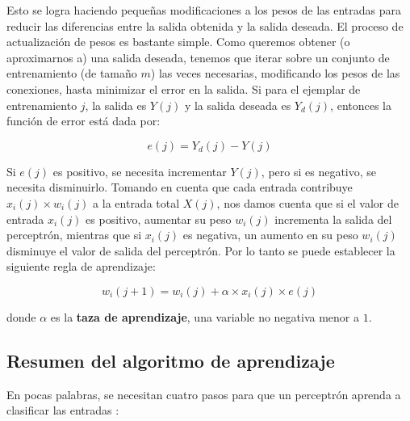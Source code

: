 Esto se logra haciendo pequeñas modificaciones a los pesos de las entradas para reducir las diferencias entre la salida obtenida y la salida deseada. El proceso de actualización de pesos es bastante simple. Como queremos obtener (o aproximarnos a) una salida deseada, tenemos que iterar sobre un conjunto de entrenamiento (de tamaño $m$) las veces necesarias, modificando los pesos de las conexiones, hasta minimizar el error en la salida. Si para el ejemplar de entrenamiento $j$, la salida es $Y(j)$ y la salida deseada es $Y_d(j)$, entonces la función de error está dada por:

\[ e(j) = Y_d(j)-Y(j)\]
\parencite[171]{Nengnevitsky2005}

Si $e(j)$ es positivo, se necesita incrementar $Y(j)$, pero si es negativo, se necesita disminuirlo. Tomando en cuenta que cada entrada contribuye \(x_i(j) \times w_i(j)\) a la entrada total $X(j)$, nos damos cuenta que si el valor de entrada $x_i(j)$ es positivo, aumentar su peso $w_i(j)$ incrementa la salida del perceptrón, mientras que si $x_i(j)$ es negativa, un aumento en su peso $w_i(j)$ disminuye el valor de salida del perceptrón. Por lo tanto se puede establecer la siguiente regla de aprendizaje:

\[w_i(j+1) = w_i(j) + \alpha \times x_i(j) \times e(j) \]
\parencite[171]{Nengnevitsky2005}

\noindent donde $\alpha$ es la \textbf{taza de aprendizaje}, una variable no negativa menor a $1$.

\subsection{Resumen del algoritmo de aprendizaje}

\noindent En pocas palabras, se necesitan cuatro pasos para que un perceptrón aprenda a clasificar las entradas \parencite[172]{Nengnevitsky2005}:\par

